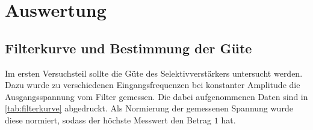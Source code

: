 \section{Auswertung}
\label{sec:Auswertung}

\subsection{Filterkurve und Bestimmung der Güte}
\label{sec:Filterkurve und Bestimmung der Güte}

Im ersten Versuchsteil sollte die Güte des Selektivverstärkers untersucht werden. Dazu
wurde zu verschiedenen Eingangsfrequenzen bei konstanter Amplitude die Ausgangsspannung
vom Filter gemessen. Die dabei aufgenommenen Daten sind in \autoref{tab:filterkurve}
abgedruckt. Als Normierung der gemessenen Spannung wurde diese normiert, sodass der
höchste Messwert den Betrag $1$ hat.

